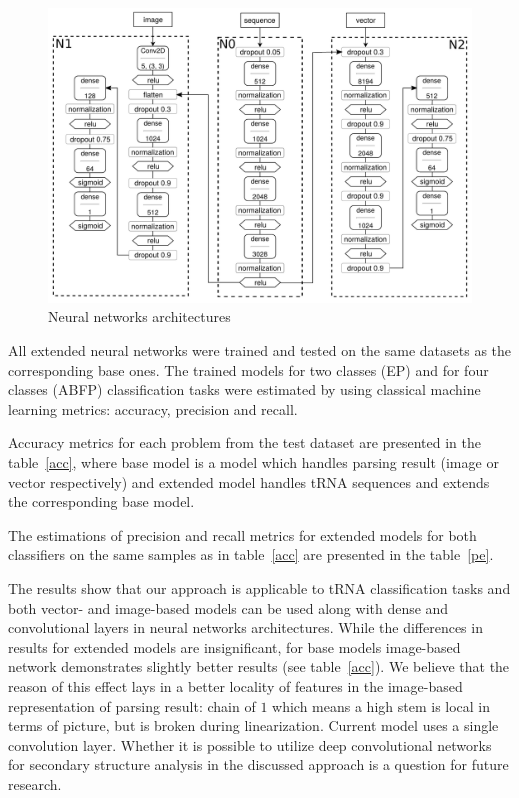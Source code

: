 \documentclass[12pt,a4paper]{cibb}
\begin{document}
\begin{figure}[h]
\begin{center}
\centering
\includegraphics[width=14cm]{nn_arch.pdf}
\caption{Neural networks architectures}
\label{nn}
\end{center}
\end{figure}


All extended neural networks were trained and tested on the same datasets as the corresponding base ones.
The trained models for two classes (EP) and for four classes (ABFP) classification tasks were estimated by using classical machine learning metrics: accuracy, precision and recall.

Accuracy metrics for each problem from the test dataset are presented in the table~\ref{acc}, where base model is a model which handles parsing result (image or vector respectively) and extended model handles tRNA sequences and extends the corresponding base model.



The estimations of precision and recall metrics for extended models for both classifiers on the same  samples as in table~\ref{acc} are presented in the table~\ref{pe}.



The results show that our approach is applicable to tRNA classification tasks and both vector- and image-based models can be used along with dense and convolutional layers in neural networks architectures.
While the differences in results for extended models are insignificant, for base models image-based network demonstrates slightly better results (see table~\ref{acc}).
We believe that the reason of this effect lays in a better locality of features in the image-based representation of parsing result: chain of $1$ which means a high stem is local in terms of picture, but is broken during linearization.
Current model uses a single convolution layer.
Whether it is possible to utilize deep convolutional networks for secondary structure analysis in the discussed approach is a question for future research.
\end{document}
